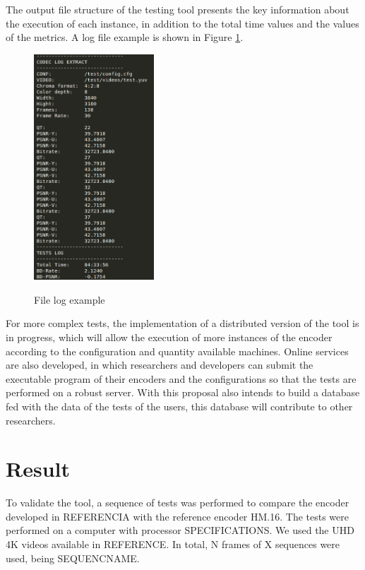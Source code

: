 \documentclass{acm_proc_article-sp}
\begin{document}
The output file structure of the testing tool presents the key information about the execution of each instance, in addition to the total time values and the values of the metrics. A log file example is shown in Figure \ref{fig:log}.

\FloatBarrier

\begin{figure}[!ht]
	\centering
	\caption{File log example}
	\includegraphics[width=0.4\textwidth]{figures/log.png}
	\label{fig:log}
\end{figure}

\FloatBarrier

For more complex tests, the implementation of a distributed version of the tool is in progress, which will allow the execution of more instances of the encoder according to the configuration and quantity available machines. Online services are also developed, in which researchers and developers can submit the executable program of their encoders and the configurations so that the tests are performed on a robust server. With this proposal also intends to build a database fed with the data of the tests of the users, this database will contribute to other researchers.
	


\section{Result}

To validate the tool, a sequence of tests was performed to compare the encoder developed in REFERENCIA with the reference encoder HM.16. The tests were performed on a computer with processor SPECIFICATIONS. We used the UHD 4K videos available in REFERENCE. In total, N frames of X sequences were used, being SEQUENCNAME.
\end{document}
